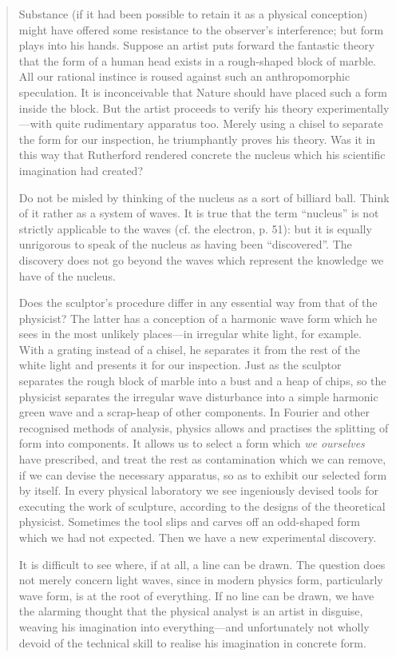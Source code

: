 \begin{quote}
    Substance (if it had been possible to retain it as a physical conception) might have offered some resistance to the observer's interference; but form plays into his hands.  Suppose an artist puts forward the fantastic theory that the form of a human head exists in a rough-shaped block of marble.  All our rational instince is roused against such an anthropomorphic speculation.  It is inconceivable that Nature should have placed such a form inside the block.  But the artist proceeds to verify his theory experimentally---with quite rudimentary apparatus too.  Merely using a chisel to separate the form for our inspection, he triumphantly proves his theory.  Was it in this way that Rutherford rendered concrete the nucleus which his scientific imagination had created?

    Do not be misled by thinking of the nucleus as a sort of billiard ball.  Think of it rather as a system of waves.  It is true that the term ``nucleus'' is not strictly applicable to the waves (cf. the electron, p. 51): but it is equally unrigorous to speak of the nucleus as having been ``discovered''.  The discovery does not go beyond the waves which represent the knowledge we have of the nucleus.

    Does the sculptor's procedure differ in any essential way from that of the physicist?  The latter has a conception of a harmonic wave form which he sees in the most unlikely places---in irregular white light, for example.  With a grating instead of a chisel, he separates it from the rest of the white light and presents it for our inspection.  Just as the sculptor separates the rough block of marble into a bust and a heap of chips, so the physicist separates the irregular wave disturbance into a simple harmonic green wave and a scrap-heap of other components.  In Fourier and other recognised methods of analysis, physics allows and practises the splitting of form into components.  It allows us to select a form which \emph{we ourselves} have prescribed, and treat the rest as contamination which we can remove, if we can devise the necessary apparatus, so as to exhibit our selected form by itself.  In every physical laboratory we see ingeniously devised tools for executing the work of sculpture, according to the designs of the theoretical physicist.  Sometimes the tool slips and carves off an odd-shaped form which we had not expected.  Then we have a new experimental discovery.

    It is difficult to see where, if at all, a line can be drawn.  The question does not merely concern light waves, since in modern physics form, particularly wave form, is at the root of everything.  If no line can be drawn, we have the alarming thought that the physical analyst is an artist in disguise, weaving his imagination into everything---and unfortunately not wholly devoid of the technical skill to realise his imagination in concrete form.


\end{quote}
